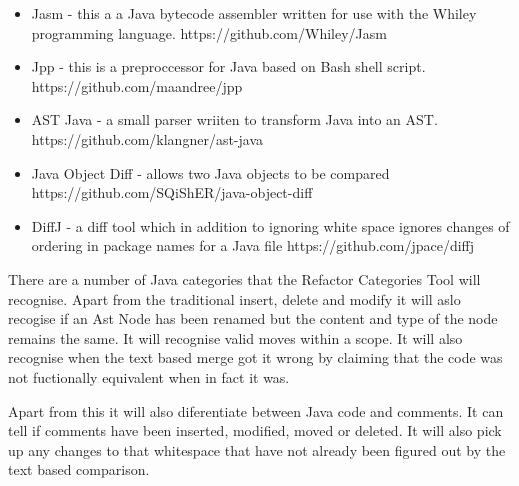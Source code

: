 \begin{itemize}
  \item Jasm - this a a Java bytecode assembler written for use with the Whiley programming language. https://github.com/Whiley/Jasm
  \item Jpp - this is a preproccessor for Java based on Bash shell script. https://github.com/maandree/jpp
  \item AST Java - a small parser wriiten to transform Java into an AST. https://github.com/klangner/ast-java
  \item Java Object Diff - allows two Java objects to be compared https://github.com/SQiShER/java-object-diff
  \item DiffJ - a diff tool which in addition to ignoring white space ignores changes of ordering in package names for a Java file https://github.com/jpace/diffj
\end{itemize}


There are a number of Java categories that the Refactor Categories Tool will recognise.  Apart from the traditional insert, delete and modify it will aslo recogise if an Ast Node has been renamed but the content and type of the node remains the same.  It will recognise valid moves within a scope. It will also recognise when the text based merge got it wrong by claiming that the code was not fuctionally equivalent when in fact it was.

Apart from this it will also diferentiate between Java code and comments.  It can tell if comments have been inserted, modified, moved or deleted.  It will also pick up any changes to that whitespace that have not already been figured out by the text based comparison.  

 
% 


% 
% 
% 
% 
% 
% 



